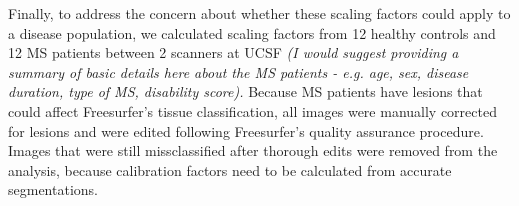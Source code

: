 Finally, to address the concern about whether these scaling factors could apply to a disease population, we calculated scaling factors from 12 healthy controls and 12 MS patients between 2 scanners at UCSF \textit{(I would suggest providing a summary of basic details here about the MS patients - e.g. age, sex, disease duration, type of MS, disability score).}\textbf{} Because MS patients have lesions that could affect Freesurfer's tissue classification, all images were manually corrected for lesions and were edited following Freesurfer's quality assurance procedure. Images that were still missclassified after thorough edits were removed from the analysis, because calibration factors need to be calculated from accurate segmentations.